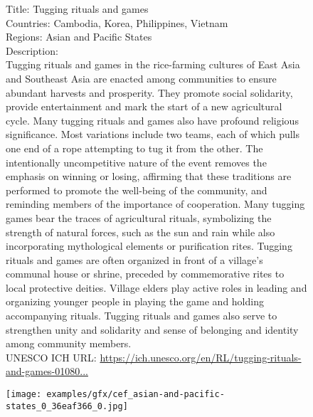 \begin{figure}[H]
\begin{tcolorbox}[colback=gray!5!white,colframe=black!75!black,fonttitle=\bfseries\scriptsize,fontupper=\ttfamily\footnotesize]
  {\large{Title:}} {\normalsize{Tugging rituals and games}}\\
  {\normalsize{Countries:}} Cambodia, Korea, Philippines, Vietnam\\
  {\normalsize{Regions:}} Asian and Pacific States\\
  {\normalsize{Description:}}\\
  Tugging rituals and games in the rice-farming cultures of East Asia and Southeast Asia are enacted among communities to ensure abundant harvests and prosperity. They promote social solidarity, provide entertainment and mark the start of a new agricultural cycle. Many tugging rituals and games also have profound religious significance. Most variations include two teams, each of which pulls one end of a rope attempting to tug it from the other. The intentionally uncompetitive nature of the event removes the emphasis on winning or losing, affirming that these traditions are performed to promote the well-being of the community, and reminding members of the importance of cooperation. Many tugging games bear the traces of agricultural rituals, symbolizing the strength of natural forces, such as the sun and rain while also incorporating mythological elements or purification rites. Tugging rituals and games are often organized in front of a village’s communal house or shrine, preceded by commemorative rites to local protective deities. Village elders play active roles in leading and organizing younger people in playing the game and holding accompanying rituals. Tugging rituals and games also serve to strengthen unity and solidarity and sense of belonging and identity among community members.\\[2mm]
  {\normalsize{UNESCO ICH URL:}} \href{https://ich.unesco.org/en/RL/tugging-rituals-and-games-01080}{https://ich.unesco.org/en/RL/tugging-rituals-and-games-01080...}
  \begin{center}
    \begin{minipage}{0.18\linewidth}
      \centering
      \texttt{[image: examples/gfx/cef\_asian-and-pacific-states\_0\_36eaf366\_0.jpg]}
      {\captionsetup{labelformat=empty}}
    \end{minipage}\hfill
    \begin{minipage}{0.18\linewidth}

\end{minipage}
\end{center}
\end{tcolorbox}
\end{figure}
